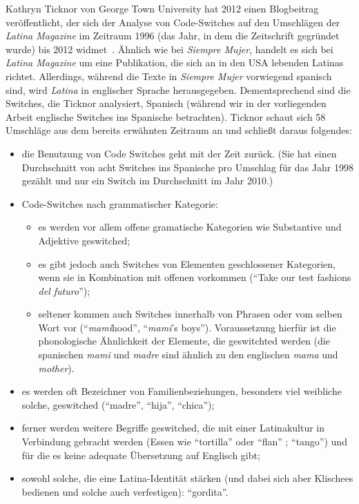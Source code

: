 Kathryn Ticknor von George Town University hat 2012 einen Blogbeitrag veröffentlicht, der sich der Analyse von Code-Switches auf den Umschlägen der \textit{Latina Magazine} im Zeitraum 1996 (das Jahr, in dem die Zeitschrift gegründet wurde) bis 2012 widmet~\cite[]{Ticknor12}.
Ähnlich wie bei \textit{Siempre Mujer}, handelt es sich bei \textit{Latina Magazine} um eine Publikation, die sich an in den USA lebenden Latinas richtet.
Allerdings, während die Texte in \textit{Siempre Mujer} vorwiegend spanisch sind, wird \textit{Latina} in englischer Sprache herausgegeben.
Dementsprechend sind die Switches, die Ticknor analysiert, Spanisch (während wir in der vorliegenden Arbeit englische Switches ins Spanische betrachten).
Ticknor schaut sich 58 Umschläge aus dem bereits erwähnten Zeitraum an und schließt daraus folgendes:
\begin{itemize}
  \item die Benutzung von Code Switches geht mit der Zeit zurück. (Sie hat einen Durchschnitt von acht Switches ins Spanische pro Umschlag für das Jahr 1998 gezählt  und nur ein Switch im Durchschnitt im Jahr 2010.)
  \item Code-Switches nach grammatischer Kategorie:
    \begin{itemize}
      \item es werden vor allem offene gramatische Kategorien wie Substantive und Adjektive geswitched;
      \item es gibt jedoch auch Switches von Elementen geschlossener Kategorien, wenn sie in Kombination mit offenen vorkommen (``Take our test fashions \textit{del futuro}'');
      \item seltener kommen auch Switches innerhalb von Phrasen oder vom selben Wort vor (``\textit{mami}hood'', ``\textit{mami}'s boys''). Voraussetzung hierfür ist die phonologische Ähnlichkeit der Elemente, die geswitchted werden (die spanischen \textit{mami} und \textit{madre} sind ähnlich zu den englischen \textit{mama} und \textit{mother}).
    \end{itemize}
  \item es werden oft Bezeichner von Familienbeziehungen, besonders viel weibliche solche, geswitched (``madre'', ``hija'', ``chica'');
  \item ferner werden weitere Begriffe geswitched, die mit einer Latinakultur in Verbindung gebracht werden (Essen wie ``tortilla'' oder ``flan'' ; ``tango'') und für die es keine adequate Übersetzung auf Englisch gibt;
  \item sowohl solche, die eine Latina-Identität stärken (und dabei sich aber Klischees bedienen und solche auch verfestigen): ``gordita''.
\end{itemize}

